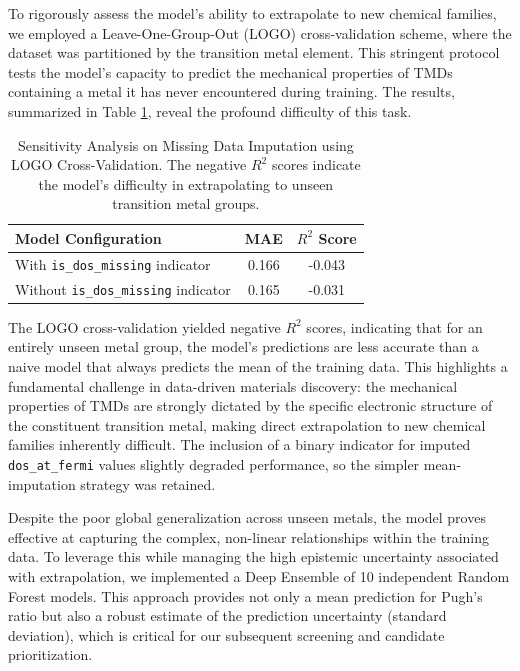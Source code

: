 \documentclass[]{article}
\begin{document}
To rigorously assess the model's ability to extrapolate to new chemical families, we employed a Leave-One-Group-Out (LOGO) cross-validation scheme, where the dataset was partitioned by the transition metal element. This stringent protocol tests the model's capacity to predict the mechanical properties of TMDs containing a metal it has never encountered during training. The results, summarized in Table \ref{tab:logo_cv}, reveal the profound difficulty of this task.

\begin{table}[h!]
\centering
\caption{Sensitivity Analysis on Missing Data Imputation using LOGO Cross-Validation. The negative $R^2$ scores indicate the model's difficulty in extrapolating to unseen transition metal groups.}
\label{tab:logo_cv}
\begin{tabular}{lcc}
\hline
\hline
Model Configuration & MAE & $R^2$ Score \\
\hline
With \texttt{is\_dos\_missing} indicator & 0.166 & -0.043 \\
Without \texttt{is\_dos\_missing} indicator & 0.165 & -0.031 \\
\hline
\end{tabular}
\end{table}

The LOGO cross-validation yielded negative $R^2$ scores, indicating that for an entirely unseen metal group, the model's predictions are less accurate than a naive model that always predicts the mean of the training data. This highlights a fundamental challenge in data-driven materials discovery: the mechanical properties of TMDs are strongly dictated by the specific electronic structure of the constituent transition metal, making direct extrapolation to new chemical families inherently difficult. The inclusion of a binary indicator for imputed \texttt{dos\_at\_fermi} values slightly degraded performance, so the simpler mean-imputation strategy was retained.

Despite the poor global generalization across unseen metals, the model proves effective at capturing the complex, non-linear relationships within the training data. To leverage this while managing the high epistemic uncertainty associated with extrapolation, we implemented a Deep Ensemble of 10 independent Random Forest models. This approach provides not only a mean prediction for Pugh's ratio but also a robust estimate of the prediction uncertainty (standard deviation), which is critical for our subsequent screening and candidate prioritization.
\end{document}
